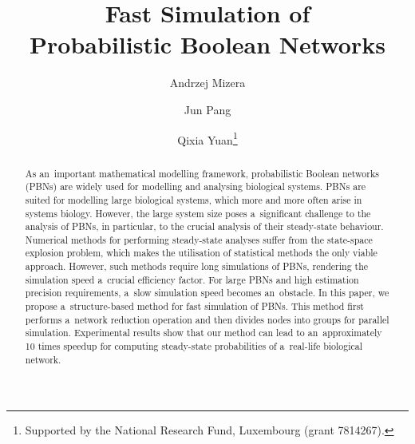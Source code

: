 \documentclass[runningheads,a4paper]{llncs}
\newcommand{\keywords}[1]{\par\addvspace\baselineskip
\noindent\keywordname\enspace\ignorespaces#1}
\begin{document}
\mainmatter

\title{Fast Simulation of \\Probabilistic Boolean Networks}


%

\author{Andrzej Mizera \and Jun Pang \and Qixia Yuan\thanks{Supported
by the National Research Fund, Luxembourg (grant 7814267). }}

\maketitle

\begin{abstract}
As an~important mathematical modelling framework,
probabilistic Boolean networks (PBNs) are widely used for
modelling and analysing biological systems.
PBNs are suited
for modelling large biological systems, which more and more often arise in systems biology.
However, the large system size poses a~significant challenge to the analysis of PBNs, in
particular, to the crucial analysis of their steady-state behaviour.
Numerical methods for performing steady-state analyses suffer from the state-space explosion
problem, which makes the utilisation of statistical methods the only viable approach. However,
such methods require long simulations of PBNs, rendering the simulation speed a~crucial efficiency factor.
For large PBNs and high estimation precision requirements, a~slow simulation
speed becomes an~obstacle. In this paper, we propose a~structure-based method for fast
simulation of PBNs. This method first performs a~network reduction operation and then divides
nodes into groups for parallel simulation. Experimental results show that our method can lead to
an~approximately 10 times speedup for computing steady-state probabilities of a~real-life biological network.

\end{abstract}
\end{document}
